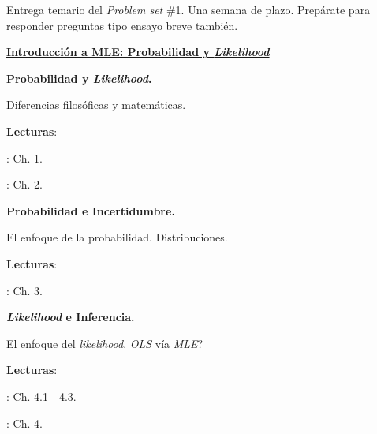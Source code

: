 \documentclass[letterpaper]{article}
\renewenvironment{itemize}{
  \begin{list}{}{
    \setlength{\leftmargin}{1.5em}
  }
}{
  \end{list}
}
\begin{document}
\begin{enumerate}[label=\roman*.]
\item[{\color{red}\Pointinghand}] Entrega temario del \emph{Problem set} \#1. Una semana de plazo. Prep\'arate para responder preguntas tipo ensayo breve tambi\'en.

	\item {\bf {\color{ForestGreen}\underline{Introducci\'on a MLE: Probabilidad y \emph{Likelihood}}}}


      \begin{itemize} 
        \item[7.] {\bf Probabilidad y \emph{Likelihood}.}
        \begin{itemize} 
          \item[$\circ$] Diferencias filos\'oficas y matem\'aticas.
          \item[$\circ$] {\bf Lecturas}: 
            \begin{itemize} 
              \item[$\diamond$] \textcite{Ward2018}: Ch. 1.
              \item[$\diamond$] \textcite{King1998}: Ch. 2.
            \end{itemize}
        \end{itemize}
      \end{itemize}


      \begin{itemize} 
        \item[8.] {\bf Probabilidad e Incertidumbre.}
        \begin{itemize} 
          \item[$\circ$] El enfoque de la probabilidad. Distribuciones. 
          \item[$\circ$] {\bf Lecturas}: 
            \begin{itemize} 
              \item[$\diamond$] \textcite{King1998}: Ch. 3.
            \end{itemize}
        \end{itemize}
      \end{itemize}


      \begin{itemize} 
        \item[9.] {\bf \emph{Likelihood} e Inferencia.}
        \begin{itemize} 
          \item[$\circ$] El enfoque del \emph{likelihood}. \emph{OLS} v\'ia \emph{MLE}?
          \item[$\circ$] {\bf Lecturas}: 
            \begin{itemize} 
              \item[$\diamond$] \textcite{King1998}: Ch. 4.1---4.3. 
              \item[$\diamond$] \textcite{Ward2018}: Ch. 4.
            \end{itemize}
        \end{itemize}
      \end{itemize}



\end{enumerate}
\end{document}
